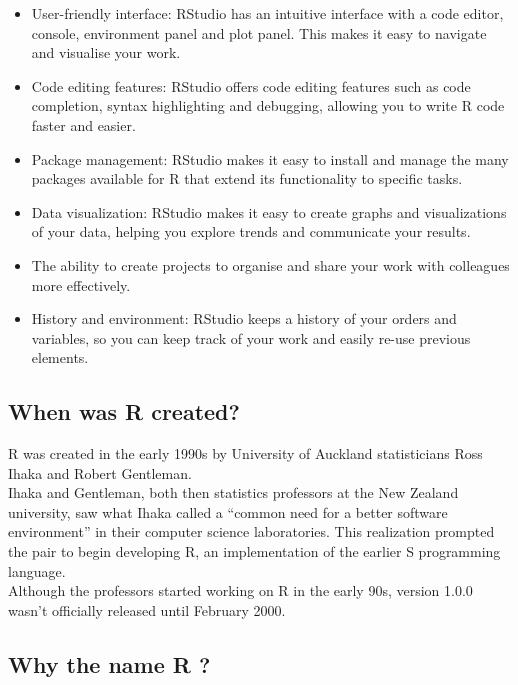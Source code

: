\documentclass[
]{book}
\providecommand{\tightlist}{%
  \setlength{\itemsep}{0pt}\setlength{\parskip}{0pt}}
\begin{document}
\begin{itemize}
\tightlist
\item
  User-friendly interface: RStudio has an intuitive interface with a code editor, console, environment panel and plot panel. This makes it easy to navigate and visualise your work.
\item
  Code editing features: RStudio offers code editing features such as code completion, syntax highlighting and debugging, allowing you to write R code faster and easier.
\item
  Package management: RStudio makes it easy to install and manage the many packages available for R that extend its functionality to specific tasks.
\item
  Data visualization: RStudio makes it easy to create graphs and visualizations of your data, helping you explore trends and communicate your results.
\item
  The ability to create projects to organise and share your work with colleagues more effectively.
\item
  History and environment: RStudio keeps a history of your orders and variables, so you can keep track of your work and easily re-use previous elements.
\end{itemize}

\hypertarget{when-was-r-created}{%
\subsection*{When was R created?}\label{when-was-r-created}}

R was created in the early 1990s by University of Auckland statisticians Ross Ihaka and Robert Gentleman.\\
Ihaka and Gentleman, both then statistics professors at the New Zealand university, saw what Ihaka called a ``common need for a better software environment'' in their computer science laboratories. This realization prompted the pair to begin developing R, an implementation of the earlier S programming language.\\
Although the professors started working on R in the early 90s, version 1.0.0 wasn't officially released until February 2000.

\hypertarget{why-the-name-r}{%
\subsection*{Why the name R ?}\label{why-the-name-r}}
\end{document}
